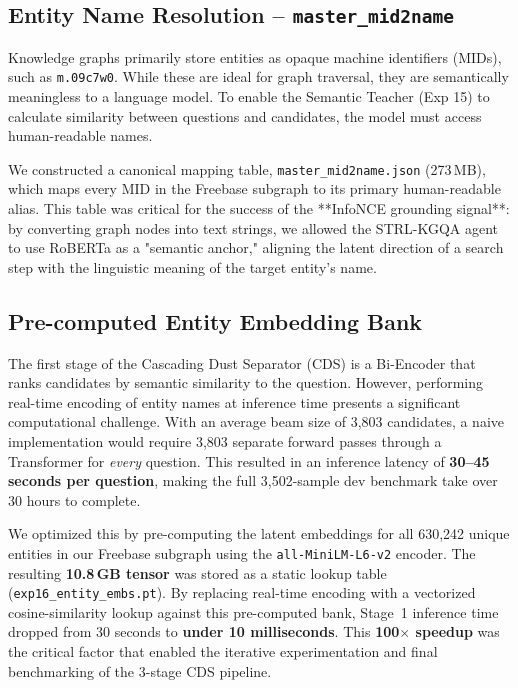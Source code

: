 \documentclass[11pt,a4paper]{article}
\newcommand{\STRL}{\textsc{STRL-KGQA}}
\begin{document}
\subsection{Entity Name Resolution -- \texttt{master\_mid2name}}
Knowledge graphs primarily store entities as opaque machine identifiers
(MIDs), such as \texttt{m.09c7w0}.
While these are ideal for graph traversal, they are semantically meaningless
to a language model.
To enable the Semantic Teacher (Exp 15) to calculate similarity between
questions and candidates, the model must access human-readable names.

We constructed a canonical mapping table, \texttt{master\_mid2name.json}
(273\,MB), which maps every MID in the Freebase subgraph to its primary
human-readable alias. 
This table was critical for the success of the **InfoNCE grounding signal**:
by converting graph nodes into text strings, we allowed the \STRL{} agent to
use RoBERTa as a "semantic anchor," aligning the latent direction of a
search step with the linguistic meaning of the target entity's name.

\subsection{Pre-computed Entity Embedding Bank}
The first stage of the Cascading Dust Separator (CDS) is a Bi-Encoder that
ranks candidates by semantic similarity to the question.
However, performing real-time encoding of entity names at inference time
presents a significant computational challenge.
With an average beam size of 3,803 candidates, a naive implementation would
require 3,803 separate forward passes through a Transformer for \emph{every}
question.
This resulted in an inference latency of \textbf{30--45 seconds per question},
making the full 3,502-sample dev benchmark take over 30 hours to complete.

We optimized this by pre-computing the latent embeddings for all 630,242 unique
entities in our Freebase subgraph using the \texttt{all-MiniLM-L6-v2} encoder.
The resulting \textbf{10.8\,GB tensor} was stored as a static lookup table
(\texttt{exp16\_entity\_embs.pt}).
By replacing real-time encoding with a vectorized cosine-similarity lookup
against this pre-computed bank, Stage~1 inference time dropped from 30 seconds
to \textbf{under 10 milliseconds}.
This \textbf{100$\times$ speedup} was the critical factor that enabled the
iterative experimentation and final benchmarking of the 3-stage CDS pipeline.
\end{document}

